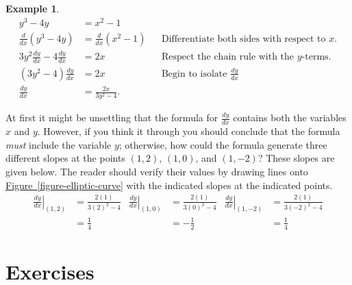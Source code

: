 \documentclass[12pt,]{book}
\theoremstyle{plain}
\theoremstyle{definition}
\newtheorem{example}[theorem]{Example}
\numberwithin{equation}{section}
\newcommand{\point}[2]{\left(#1,#2\right)}
\newcommand{\lz}[2]{\frac{d#1}{d#2}}
\newcommand{\lzoo}[2]{{\frac{d}{d#1}}{\left(#2\right)}}
\newcommand{\lzoa}[3]{\left.{\frac{d#1}{d#2}}\right|_{#3}}
\begin{document}
\begin{example}\label{example-implicit-differentiation}
\begin{align*}
y^3-4y&=x^2-1\\
\lzoo{x}{y^3-4y}&=\lzoo{x}{x^2-1}&&\text{Differentiate both sides with respect to $x$.}\\
3y^2\lz{y}{x}-4\lz{y}{x}&=2x&&\text{Respect the chain rule with the $y$-terms.}\\
\left(3y^2-4\right)\lz{y}{x}&=2x&&\text{Begin to isolate $\lz{y}{x}$}\\
\lz{y}{x}&=\frac{2x}{3y^2-4}.
\end{align*}%
\end{example}
\par
At first it might be unsettling that the formula for \(\lz{y}{x}\) contains both the variables \(x\) and \(y\). However, if you think it through you should conclude that the formula \emph{must} include the variable \(y\); otherwise, how could the formula generate three different slopes at the points \(\point{1}{2}\), \(\point{1}{0}\), and \(\point{1}{-2}\)?  These slopes are given below.  The reader should verify their values by drawing lines onto \hyperref[figure-elliptic-curve]{Figure~\ref*{figure-elliptic-curve}} with the indicated slopes at the indicated points.\begin{align*}
\lzoa{y}{x}{\point{1}{2}}&=\frac{2(1)}{3(2)^2-4}&\lzoa{y}{x}{\point{1}{0}}&=\frac{2(1)}{3(0)^2-4}&\lzoa{y}{x}{\point{1}{-2}}&=\frac{2(1)}{3(-2)^2-4}\\
&=\frac{1}{4}&&=-\frac{1}{2}&&=\frac{1}{4}
\end{align*}%
\typeout{************************************************}
\typeout{************************************************}
\section*{Exercises}\label{exercises-44}
\end{document}
